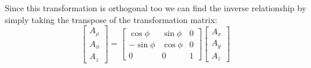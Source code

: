             Since this transformation is orthogonal too we can find the inverse relationship by simply taking the transpose of the transformation matrix:
            \begin{equation}
                \begin{bmatrix}
                    A_\rho \\ A_\phi \\ A_z
                \end{bmatrix}
                =
                \begin{bmatrix}
                    \cos\phi & \sin\phi & 0 \\
                    -\sin\phi & \cos\phi & 0 \\
                    0 & 0 & 1
                \end{bmatrix}
                \begin{bmatrix}
                    A_x \\ A_y \\ A_z
                \end{bmatrix}
            \end{equation}
